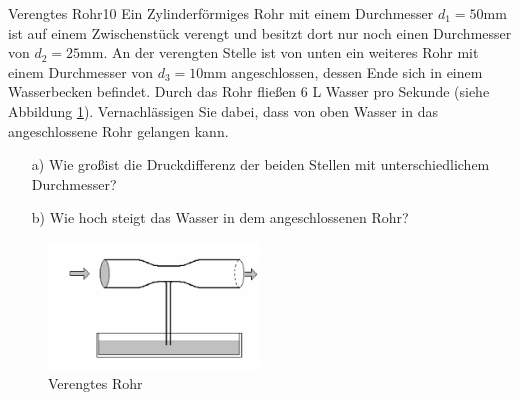 \begin{exercise}{Verengtes Rohr}{10}
  Ein Zylinderförmiges Rohr mit einem Durchmesser $d_{1}=50$mm ist auf
  einem Zwischenstück verengt und besitzt dort nur noch einen Durchmesser von
  $d_{2}=25$mm. An der verengten Stelle ist von unten ein weiteres Rohr mit
  einem Durchmesser von $d_{3}=10$mm angeschlossen, dessen Ende sich in einem
  Wasserbecken befindet. Durch das Rohr flie\ss en 6 L Wasser pro Sekunde
  (siehe Abbildung \ref{fig:Verengtes_Rohr}). Vernachlässigen Sie dabei, dass von
  oben Wasser in das angeschlossene Rohr gelangen kann.

  \begin{enumerate}
    \item [a)] Wie gro\ss ist die Druckdifferenz der beiden Stellen mit unterschiedlichem
               Durchmesser?
    \item [b)] Wie hoch steigt das Wasser in dem angeschlossenen Rohr?
  \end{enumerate}
\end{exercise}

\FloatBarrier

  \begin{figure}[h]
    \centering
    \includegraphics[width = 0.5\textwidth]{Rohr.jpg}
    \caption{Verengtes Rohr}
    \label{fig:Verengtes_Rohr}
  \end{figure}

